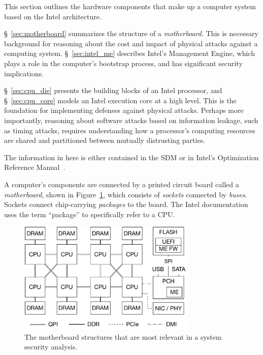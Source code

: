 \label{sec:computer_map}


This section outlines the hardware components that make up a computer system
based on the Intel architecture.

\S~\ref{sec:motherboard} summarizes the structure of a \textit{motherboard}.
This is necessary background for reasoning about the cost and impact of
physical attacks against a computing system. \S~\ref{sec:intel_me} describes
Intel's Management Engine, which plays a role in the computer's bootstrap
process, and has significant security implications.

\S~\ref{sec:cpu_die} presents the building blocks of an Intel processor, and
\S~\ref{sec:cpu_core} models an Intel execution core at a high level. This is
the foundation for implementing defenses against physical attacks. Perhaps more
importantly, reasoning about software attacks based on information leakage,
such as timing attacks, requires understanding how a processor's computing
resources are shared and partitioned between mutually distrusting parties.

The information in here is either contained in the SDM or in Intel's
Optimization Reference Manual~\cite{intel2014optimization}.


\label{sec:motherboard}

A computer's components are connected by a printed circuit board called a
\textit{motherboard}, shown in Figure~\ref{fig:motherboard}, which consists of
\textit{sockets} connected by \textit{buses}. Sockets connect chip-carrying
\textit{packages} to the board. The Intel documentation uses the term
``package'' to specifically refer to a CPU.

\begin{figure}[hbt]
  \centering
  \includegraphics[width=85mm]{figures/motherboard.pdf}
  \caption{
    The motherboard structures that are most relevant in a system security
    analysis.
  }
  \label{fig:motherboard}
\end{figure}

